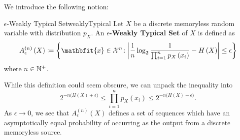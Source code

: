\documentclass[math, code]{amznotes}
\theoremstyle{remark}
\begin{document}
We introduce the following notion:
\begin{dfnbox}{$\epsilon$-Weakly Typical Set}{weaklyTypical}
    Let $X$ be a discrete memoryless random variable with distribution $p_X$. An {\color{red} \textbf{$\epsilon$-Weakly Typical Set}} of $X$ is defined as 
    \begin{equation*}
        A_{\epsilon}^{\left(n\right)}\left(X\right) \coloneqq \left\{\mathbfit{x} \in \mathcal{X}^n \colon \abs{\frac{1}{n}\log_2\frac{1}{\prod_{i = 1}^np_X\left(x_i\right)} - H\left(X\right)} \leq \epsilon\right\}
    \end{equation*}
    where $n \in \mathbb{N}^+$.
\end{dfnbox}
While this definition could seem obscure, we can unpack the inequality into 
\begin{equation*}
    2^{-n\bigl(H\left(X\right) + \epsilon\bigr)} \leq \prod_{i = 1}^np_X\left(x_i\right) \leq 2^{-n\bigl(H\left(X\right) - \epsilon\bigr)}.
\end{equation*}
As $\epsilon \to 0$, we see that $A_{\epsilon}^{\left(n\right)}\left(X\right)$ defines a set of sequences which have an asymptotically equal probability of occurring as the output from a discrete memoryless source.
\end{document}
